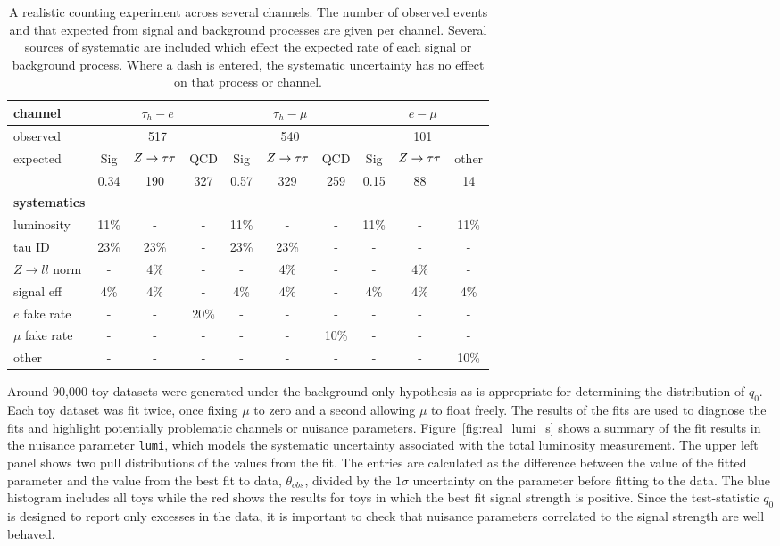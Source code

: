 \begin{table}
\centering
\begin{tabular}{|l|c|c|c|c|c|c|c|c|c|}
\hline
\textbf{channel} & \multicolumn{3}{c|}{$\tau_{h}-e$} & \multicolumn{3}{|c|}{$\tau_{h}-\mu$} 
&\multicolumn{3}{c|}{$e-\mu$}   	\\ \hline
observed & \multicolumn{3}{c}{517} &\multicolumn{3}{|c|}{540} & \multicolumn{3}{c|}{101} \\ \hline
expected & Sig & $Z\rightarrow\tau\tau$ & QCD & Sig & $Z\rightarrow\tau\tau$ & QCD &Sig & $Z\rightarrow\tau\tau$ & other 		\\ \hline
	 & 0.34 & 190 & 327 &  0.57 & 329 & 259 & 0.15 & 88 & 14			\\ \hline
\hline
\textbf{systematics} & \multicolumn{9}{c|}{} \\ \hline
luminosity	 & 11\% & - & - & 11\% & - & - & 11\% & - & 11\% 	\\ \hline 
tau ID	 & 23\% & 23\% & - & 23\% & 23\% & - & - & - & -  	\\ \hline 
$Z\rightarrow ll$ norm    & - & 4\% & - & - & 4\% & - & - & 4\% & - 		\\ \hline
signal eff    & 4\% & 4\%&  - & 4\% & 4\% & - & 4\% & 4\% & 4\%	\\ \hline  
$e$ fake rate	 & - & - & 20\% & - & - & - & - & - & - 		\\ \hline
$\mu$ fake rate    & - & - & - & - & - & 10\% & - & - & -			\\ \hline
other  & - & - & - & - & - & - & - & - & 10\%			\\ \hline
\end{tabular}
\caption{A realistic counting experiment across several channels. 
The number of observed events and that expected from signal and background
processes are given per channel. Several sources of systematic are included 
which effect the expected rate of each signal or background process. 
Where a dash is entered, the systematic uncertainty has no effect on that 
process or channel.} 
\label{tab:realanalysis}
\end{table}

Around 90,000 toy datasets were generated under the background-only hypothesis as is 
appropriate for determining the distribution of $q_{0}$. 
Each toy dataset was fit twice, once fixing $\mu$ to zero and a second allowing $\mu$ to float freely.
The results of the fits are used to diagnose the fits and highlight 
potentially problematic channels or nuisance parameters. 
Figure~\ref{fig:real_lumi_s} shows a summary of the fit results 
in the nuisance parameter \texttt{lumi}, 
which models the systematic uncertainty associated with the total luminosity measurement.
The upper left panel shows two pull distributions of the values from the fit. The entries are
calculated as the difference between the value of the fitted parameter
and the value from the best fit to data, $\theta_{obs}$, divided by 
the $1\sigma$ uncertainty on the parameter before fitting to the data. 
The blue histogram includes all toys while the red shows the results
for toys in which the best fit signal strength is positive. Since the test-statistic $q_{0}$ 
is designed to report only excesses in the data,
it is important to check that nuisance parameters correlated to the signal 
strength are well behaved.

